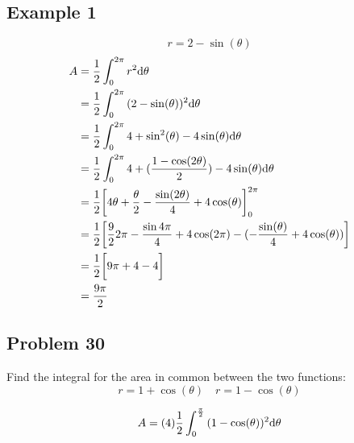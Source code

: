 \documentclass[letterpaper, 12pt]{math}
\begin{document}
\subsection*{Example 1}
\[ r = 2-\sin(\theta) \]
\begin{align*}
  A &= \frac{1}{2}\int_{0}^{2\pi}{r^{2}\mathrm{d}{\theta}} \\
  &= \frac{1}{2}\int_{0}^{2\pi}{(2-\sin(\theta))^{2}\mathrm{d}{\theta}} \\
  &= \frac{1}{2}\int_{0}^{2\pi}
    {4+\sin^{2}(\theta)-4\sin(\theta)\mathrm{d}{\theta}} \\
  &= \frac{1}{2}\int_{0}^{2\pi}
    {4+(\frac{1-\cos(2\theta)}{2})-4\sin(\theta)\mathrm{d}{\theta}} \\
  &= \frac{1}{2}\bigg[4\theta+\frac{\theta}{2}-
    \frac{\sin(2\theta)}{4}+4\cos(\theta)\bigg]_{0}^{2\pi} \\
  &= \frac{1}{2}\bigg[\frac{9}{2}{2\pi}-\frac{\sin{4\pi}}{4}+4\cos(2\pi)-
    (-\frac{\sin(\theta)}{4}+4\cos(\theta))\bigg] \\
  &= \frac{1}{2}\bigg[9\pi+4-4\bigg] \\
  &= \frac{9\pi}{2}
\end{align*}

\subsection*{Problem 30}
Find the integral for the area in common between the two functions:
\[ r = 1+\cos(\theta) \quad r = 1-\cos(\theta) \]
\begin{center}
\end{center}
\[ A = (4)\frac{1}{2}\int_{0}^{\frac{\pi}{2}}
   {(1-\cos(\theta))^{2}\mathrm{d}{\theta}} \]
\end{document}
